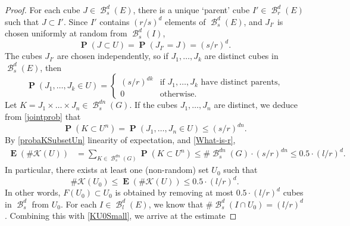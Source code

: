 \documentclass[dvipsnames,letterpaper,12pt]{article}
\numberwithin{equation}{section}
\theoremstyle{plain}
\theoremstyle{remark}
\DeclareMathOperator{\Prob}{\mathbf{P}}
\DeclareMathOperator{\Expect}{\mathbf{E}}
\DeclareMathOperator{\B}{\mathcal{B}}
\begin{document}
\begin{proof}
	For each cube $J \in \B_s^d(E)$, there is a unique `parent' cube $I' \in \B_r^d(E)$ such that $J \subset I'$. Since $I'$ contains $(r/s)^d$ elements of $\B^d_s(E)$, and $J_{I'}$ is chosen uniformly at random from $\B^d_s(I)$,
	\[ \Prob(J \subset U) = \Prob(J_{I'} = J) = (s/r)^d. \]
	The cubes $J_{I'}$ are chosen independently, so if $J_1, \dots, J_k$ are distinct cubes in $\B^d_s(E)$, then %
	\begin{equation}\label{jointprob}
	\Prob(J_1, \dots, J_k \in U) = \begin{cases} (s/r)^{dk} & \text{if $J_1, \dots, J_k$ have distinct parents,} \\ 0 & \text{otherwise}. \end{cases} 
	\end{equation}
	Let $K = J_1 \times \dots \times J_n \in \B^{dn}_s(G)$. If the cubes $J_1, \dots, J_n$ are distinct, we deduce from \eqref{jointprob} that
	\begin{equation}\label{probaKSubsetUn}
		\Prob(K \subset U^n) = \Prob(J_1, \dots, J_n \in U) \leq (s/r)^{dn}.
	\end{equation}
	By \eqref{probaKSubsetUn} linearity of expectation, and \eqref{What-is-r},
	\begin{align*}
		\Expect(\# \mathcal{K}(U)) &= \sum_{K \in \B^{dn}_s(G)} \Prob(K \subset U^n) \leq \# \B_s^{dn}(G) \cdot (s/r)^{dn}
		\leq 0.5 \cdot (l/r)^d.
	\end{align*}
	In particular, there exists at least one (non-random) set $U_0$ such that
	\begin{equation}\label{KU0Small}
		\# \mathcal{K}(U_0) \leq \Expect(\# \mathcal{K}(U)) \leq 0.5 \cdot (l/r)^d.
	\end{equation}
	 In other words, $F(U_0) \subset U_0$ is obtained by removing at most $0.5 \cdot (l/r)^d$ cubes in $\B^d_s$ from $U_0$. For each $I \in \B_l^d(E)$, we know that $\# \B_{s}^d(I \cap U_0) = (l/r)^d$. Combining this with \eqref{KU0Small}, we arrive at the estimate 

\end{proof}
\end{document}
